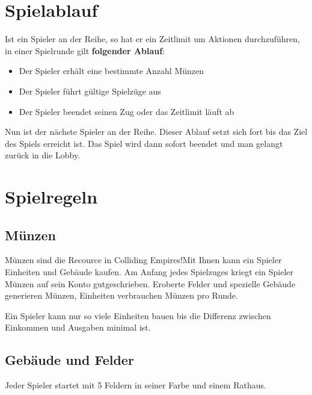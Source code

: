 \documentclass[12pt,a4paper]{article}
\begin{document}
\section{Spielablauf}

Ist ein Spieler an der Reihe, so hat er ein Zeitlimit um Aktionen durchzuführen, in einer Spielrunde gilt \textbf{folgender Ablauf}:

\begin{itemize}
	\item	Der Spieler erhält eine bestimmte Anzahl Münzen 
	\item	Der Spieler führt gültige Spielzüge aus
	\item	Der Spieler beendet seinen Zug oder das Zeitlimit läuft ab
\end{itemize}

Nun ist der nächste Spieler an der Reihe. Dieser Ablauf setzt sich fort bis das Ziel des Spiels erreicht ist. Das Spiel wird dann sofort beendet und man gelangt zurück in die Lobby.

\section{Spielregeln}

\subsection{Münzen}
Münzen sind die Recource in \glqq Colliding Empires!\grqq Mit Ihnen kann ein Spieler Einheiten und Gebäude kaufen. Am Anfang jedes Spielzuges kriegt ein Spieler Münzen auf sein Konto gutgeschrieben. Eroberte Felder und spezielle Gebäude generieren Münzen, Einheiten verbrauchen Münzen pro Runde.

Ein Spieler kann nur so viele Einheiten bauen bis die Differenz zwischen Einkommen und Ausgaben minimal ist. 

\subsection{Gebäude und Felder}
Jeder Spieler startet mit 5 Feldern in seiner Farbe und einem Rathaus.
\begin{table}[h!]
\end{table}
\end{document}
